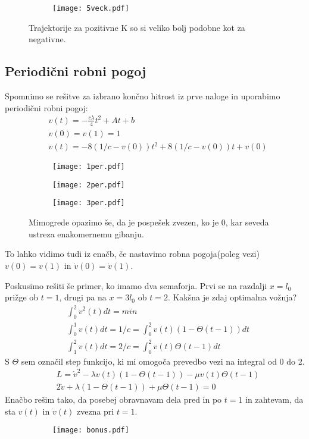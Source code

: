 \documentclass{article}
\begin{document}
\begin{figure}[H]
\centering
\begin{subfigure}{.5\textwidth}
\texttt{[image: 5veck.pdf]}
\end{subfigure}
\caption*{Trajektorije za pozitivne K so si veliko bolj podobne kot za negativne.}
\end{figure}

\subsection{Periodični robni pogoj}
Spomnimo se rešitve za izbrano končno hitrost iz prve naloge in uporabimo periodični robni pogoj:
\begin{align*}
&v(t) = -\frac{c \lambda}{4} t^2 + At + b \\
&v(0)=v(1) = 1 \\
&v(t) = -8(1/c - v(0)) t^2 + 8(1/c-v(0))t + v(0)
\end{align*}

\begin{figure}[H]
\centering
\begin{subfigure}{.5\textwidth}
\texttt{[image: 1per.pdf]}
\end{subfigure}
\end{figure}

\begin{figure}[H]
\begin{subfigure}{.5\textwidth}
\texttt{[image: 2per.pdf]}
\end{subfigure}
\begin{subfigure}{.5\textwidth}
\texttt{[image: 3per.pdf]}
\end{subfigure}
\caption*{Mimogrede opazimo še, da je pospešek zvezen, ko je 0, kar seveda ustreza enakomernemu gibanju.}
\end{figure}

To lahko vidimo tudi iz enačb, če nastavimo robna pogoja(poleg vezi) $v(0) = v(1)$ in $\dot{v}(0) = \dot{v}(1)$.


Poskusimo rešiti še primer, ko imamo dva semaforja. Prvi se na razdalji $x=l_0$ prižge ob $t=1$, drugi pa na $x=3l_0$ ob $t=2$. Kakšna je zdaj optimalna vožnja?
\begin{align*}
&\int_0^2 \dot{v}^2(t) dt = min \\
&\int_0^1 v(t) dt = 1/c = \int_0^2 v(t) (1-\Theta(t-1))dt\\
&\int_1^2 v(t) dt = 2/c = \int_0^2 v(t) \Theta(t-1) dt
\end{align*}
S $\Theta$ sem označil step funkcijo, ki mi omogoča prevedbo vezi na integral od 0 do 2.
\begin{align*}
&L = \dot{v}^2 - \lambda v(t)(1-\Theta(t-1)) - \mu v(t)\Theta(t-1) \\
&2\ddot{v} + \lambda (1-\Theta(t-1)) + \mu \Theta(t-1) = 0
\end{align*}
Enačbo rešim tako, da posebej obravnavam dela pred in po $t=1$ in zahtevam, da sta  $v(t)$ in $\dot{v}(t)$ zvezna pri $t=1$.

\begin{figure}[H]
\centering
\begin{subfigure}{.5\textwidth}
\texttt{[image: bonus.pdf]}
\end{subfigure}
\end{figure}
\end{document}
